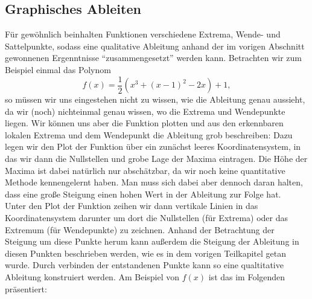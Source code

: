 \documentclass[../../main.tex]{subfiles}
\begin{document}
    \subsection{Graphisches Ableiten}
    Für gewöhnlich beinhalten Funktionen verschiedene Extrema, Wende- und Sattelpunkte, sodass eine qualitative Ableitung anhand der im vorigen Abschnitt gewonnenen Ergenntnisse \enquote{zusammengesetzt} werden kann.
    Betrachten wir zum Beispiel einmal das Polynom
    $$f(x) = \frac{1}{2}\left( x^3 + (x-1)^2 - 2x\right)+1,$$
    so müssen wir uns eingestehen nicht zu wissen, wie die Ableitung genau aussieht, da wir (noch) nichteinmal genau wissen, wo die Extrema und Wendepunkte liegen. Wir können uns aber die Funktion plotten und aus den erkennbaren lokalen Extrema und dem Wendepunkt die Ableitung grob beschreiben: Dazu legen wir den Plot der Funktion über ein zunächst leeres Koordinatensystem, in das wir dann die Nullstellen und grobe Lage der Maxima eintragen. Die Höhe der Maxima ist dabei natürlich nur abschätzbar, da wir noch keine quantitative Methode kennengelernt haben. Man muss sich dabei aber dennoch daran halten, dass eine große Steigung einen hohen Wert in der Ableitung zur Folge hat.\\
    Unter den Plot der Funktion zeihen wir dann vertikale Linien in das Koordinatensystem darunter um dort die Nullstellen (für Extrema) oder das Extremum (für Wendepunkte) zu zeichnen. Anhand der Betrachtung der Steigung um diese Punkte herum kann außerdem die Steigung der Ableitung in diesen Punkten beschrieben werden, wie es in dem vorigen Teilkapitel getan wurde. Durch verbinden der entstandenen Punkte kann so eine qualtitative Ableitung konstruiert werden. Am Beispiel von $f(x)$ ist das im Folgenden präsentiert:
    \begin{center}\normalsize
    \end{center}
             
\end{document}

